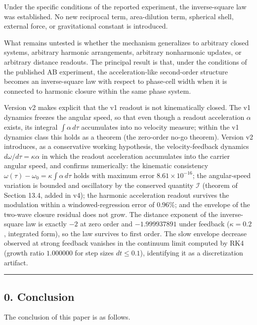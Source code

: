 \documentclass[
  a4paper,
]{article}
\begin{document}
Under the specific conditions of the reported experiment, the
inverse-square law was established. No new reciprocal term,
area-dilution term, spherical shell, external force, or gravitational
constant is introduced.

What remains untested is whether the mechanism generalizes to arbitrary
closed systems, arbitrary harmonic arrangements, arbitrary nonharmonic
updates, or arbitrary distance readouts. The principal result is that,
under the conditions of the published AB experiment, the
acceleration-like second-order structure becomes an inverse-square law
with respect to phase-cell width when it is connected to harmonic
closure within the same phase system.

Version v2 makes explicit that the v1 readout is not kinematically
closed. The v1 dynamics freezes the angular speed, so that even though a
readout acceleration \(\alpha\) exists, its integral
\(\int\alpha\,d\tau\) accumulates into no velocity measure; within the
v1 dynamics class this holds as a theorem (the zero-order no-go
theorem). Version v2 introduces, as a conservative working hypothesis,
the velocity-feedback dynamics \(d\omega/d\tau=\kappa\alpha\) in which
the readout acceleration accumulates into the carrier angular speed, and
confirms numerically: the kinematic consistency
\(\omega(\tau)-\omega_0=\kappa\int\alpha\,d\tau\) holds with maximum
error \(8.61\times10^{-16}\); the angular-speed variation is bounded and
oscillatory by the conserved quantity \(\mathcal I\) (theorem of Section
13.4, added in v4); the harmonic acceleration readout survives the
modulation within a windowed-regression error of \(0.96\%\); and the
envelope of the two-wave closure residual does not grow. The distance
exponent of the inverse-square law is exactly \(-2\) at zero order and
\(-1.999937891\) under feedback (\(\kappa=0.2\), integrated form), so
the law survives to first order. The slow envelope decrease observed at
strong feedback vanishes in the continuum limit computed by RK4 (growth
ratio \(1.000000\) for step sizes \(dt\le0.1\)), identifying it as a
discretization artifact.

\begin{center}\rule{0.5\linewidth}{0.5pt}\end{center}

\subsection{0. Conclusion}\label{conclusion}

The conclusion of this paper is as follows.
\end{document}
